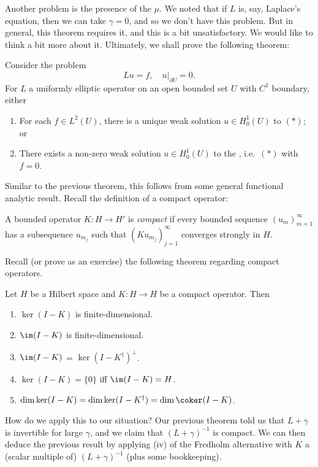 \documentclass[a4paper]{article}
\begin{document}
Another problem is the presence of the $\mu$. We noted that if $L$ is, say, Laplace's equation, then we can take $\gamma = 0$, and so we don't have this problem. But in general, this theorem requires it, and this is a bit unsatisfactory. We would like to think a bit more about it. Ultimately, we shall prove the following theorem:
\begin{thm}
  Consider the problem
  \[
    Lu = f,\quad u|_{\partial U} = 0.\tag{$*$}
  \]
  For $L$ a uniformly elliptic operator on an open bounded set $U$ with $C^1$ boundary, either
  \begin{enumerate}
    \item For each $f \in L^2(U)$, there is a unique weak solution $u \in H_0^1(U)$ to $(*)$; or
    \item There exists a non-zero weak solution $u \in H_0^1(U)$ to the , i.e.\ $(*)$ with $f = 0$.
  \end{enumerate}
\end{thm}

Similar to the previous theorem, this follows from some general functional analytic result. Recall the definition of a compact operator:
\begin{defi}
  A bounded operator $K: H \to H'$ is \emph{compact} if every bounded sequence $(u_m)_{m = 1}^\infty$ has a subsequence $u_{m_j}$ such that $(K u_{m_j})_{j = 1}^\infty$ converges strongly in $H$.
\end{defi}

Recall (or prove as an exercise) the following theorem regarding compact operators.
\begin{thm}
  Let $H$ be a Hilbert space and $K: H \to H$ be a compact operator. Then
  \begin{enumerate}
    \item $\ker (I - K)$ is finite-dimensional.
    \item $\im (I - K)$ is finite-dimensional.
    \item $\im (I - K)$ = $\ker (I - K^\dagger)^\perp$.
    \item $\ker (I - K) = \{0\}$ iff $\im (I - K) = H$.
    \item $\dim \ker (I - K) = \dim \ker (I - K^\dagger) = \dim \coker (I - K)$.
  \end{enumerate}
\end{thm}

How do we apply this to our situation? Our previous theorem told us that $L + \gamma$ is invertible for large $\gamma$, and we claim that $(L + \gamma)^{-1}$ is compact. We can then deduce the previous result by applying (iv) of the Fredholm alternative with $K$ a (scalar multiple of) $(L + \gamma)^{-1}$ (plus some bookkeeping).
\end{document}
